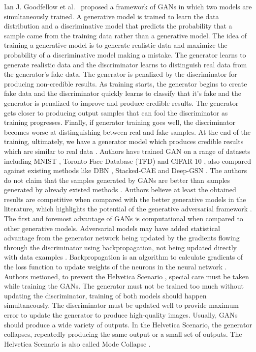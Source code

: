 Ian J. Goodfellow et al.\ \cite{goodfellow2014generative} proposed a framework of \acp{GAN} in which two models are simultaneously trained. A generative model is trained to learn the data distribution and a discriminative model that predicts the probability that a sample came from the training data rather than a generative model. The idea of training a generative model is to generate realistic data and maximize the probability of a discriminative model making a mistake. The generator learns to generate realistic data and the discriminator learns to distinguish real data from the generator's fake data. The generator is penalized by the discriminator for producing non-credible results. As training starts, the generator begins to create fake data and the discriminator quickly learns to classify that it's fake and the generator is penalized to improve and produce credible results. The generator gets closer to producing output samples that can fool the discriminator as training progresses. Finally, if generator training goes well, the discriminator becomes worse at distinguishing between real and fake samples.  At the end of the training, ultimately, we have a generator model which produces credible results which are similar to real data \cite{goodfellow2014generative}. Authors have trained \ac{GAN} on a range of datasets including MNIST \cite{726791}, Toronto Face Database (TFD) \cite{susskind2010toronto} and CIFAR-10 \cite{krizhevsky2009learning}, also compared against existing methods like \ac{DBN} \cite{bengio2012better}, \ac{Stacked-CAE} \cite{bengio2012better} and \ac{Deep-GSN} \cite{bengio2014deep}. The authors do not claim that the samples generated by \acp{GAN} are better than samples generated by already existed methods \cite{goodfellow2014generative}. Authors believe at least the obtained results are competitive when compared with the better generative models in the literature, which highlights the potential of the generative adversarial framework \cite{goodfellow2014generative}. The first and foremost advantage of \acp{GAN} is computational when compared to other generative models. Adversarial models may have added statistical advantage from the generator network being updated by the gradients flowing through the discriminator using backpropagation, not being updated directly with data examples \cite{goodfellow2014generative}. Backpropagation is an algorithm to calculate gradients of the loss function to update weights of the neurons in the neural network \cite{goodfellow2017deep}. Authors metioned, to prevent the Helvetica Scenario \cite{manisha2019generative}, special care must be taken while training the \acp{GAN}. The generator must not be trained too much without updating the discriminator, training of both models should happen simultaneously. The discriminator must be updated well to provide maximum error to update the generator to produce high-quality images. Usually, \acp{GAN} should produce a wide variety of outputs. In the Helvetica Scenario, the generator collapses, repeatedly producing the same output or a small set of outputs. The Helvetica Scenario is also called Mode Collapse \cite{thanhtung2020catastrophic}.

